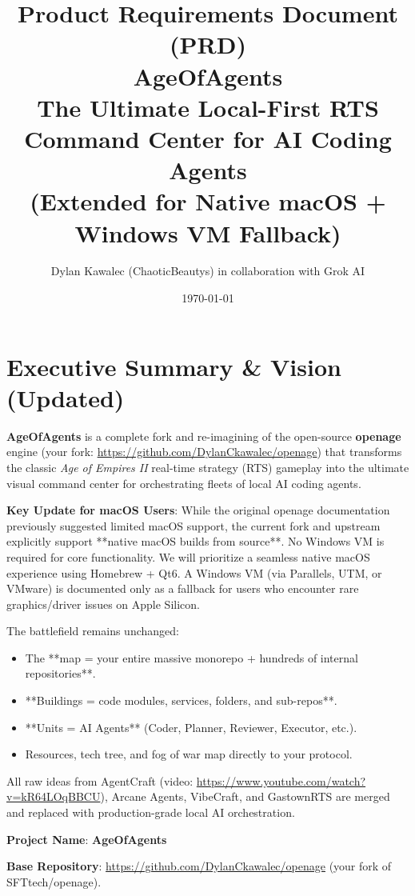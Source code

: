 \documentclass[11pt,a4paper]{article}
\title{\textbf{Product Requirements Document (PRD)}\\
\textbf{AgeOfAgents}\\[0.5em]
\large The Ultimate Local-First RTS Command Center for AI Coding Agents \\
\large (Extended for Native macOS + Windows VM Fallback)}
\author{Dylan Kawalec (ChaoticBeautys) in collaboration with Grok AI}
\date{\today}
\begin{document}
\maketitle

\tableofcontents
\newpage

\section{Executive Summary \& Vision (Updated)}

\textbf{AgeOfAgents} is a complete fork and re-imagining of the open-source \textbf{openage} engine (your fork: \href{https://github.com/DylanCkawalec/openage}{https://github.com/DylanCkawalec/openage}) that transforms the classic \textit{Age of Empires II} real-time strategy (RTS) gameplay into the ultimate visual command center for orchestrating fleets of local AI coding agents.

\textbf{Key Update for macOS Users}: While the original openage documentation previously suggested limited macOS support, the current fork and upstream explicitly support **native macOS builds from source**. No Windows VM is required for core functionality. We will prioritize a seamless native macOS experience using Homebrew + Qt6. A Windows VM (via Parallels, UTM, or VMware) is documented only as a fallback for users who encounter rare graphics/driver issues on Apple Silicon.

The battlefield remains unchanged:
\begin{itemize}
    \item The **map = your entire massive monorepo + hundreds of internal repositories**.
    \item **Buildings = code modules, services, folders, and sub-repos**.
    \item **Units = AI Agents** (Coder, Planner, Reviewer, Executor, etc.).
    \item Resources, tech tree, and fog of war map directly to your protocol.
\end{itemize}

All raw ideas from AgentCraft (video: \href{https://www.youtube.com/watch?v=kR64LOqBBCU}{https://www.youtube.com/watch?v=kR64LOqBBCU}), Arcane Agents, VibeCraft, and GastownRTS are merged and replaced with production-grade local AI orchestration.

\textbf{Project Name}: \textbf{AgeOfAgents}

\textbf{Base Repository}: \href{https://github.com/DylanCkawalec/openage}{https://github.com/DylanCkawalec/openage} (your fork of SFTtech/openage).
\end{document}
